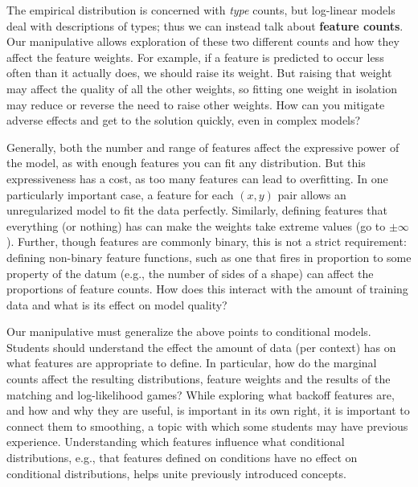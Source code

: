\documentclass[11pt,letterpaper]{article}
\newcommand{\Data}[0]{\ensuremath{\mathcal{D}}}
\begin{document}
The empirical distribution is concerned with \textit{type} counts, but log-linear models 
deal with descriptions of types; thus we can instead talk about \textbf{feature counts}. Our 
manipulative allows exploration of these two different counts and how they affect the 
feature weights. For example, if a feature is predicted to occur less often than it actually does, 
we should raise its weight. But raising that weight 
may affect the quality of all the other weights, so fitting one weight in
isolation may reduce or reverse the need to raise other weights. How can you mitigate  
adverse effects and get to the solution quickly, even in complex models?

Generally, both the number and range of features affect the expressive 
power of the model, as with enough features you can fit any distribution. But this expressiveness 
has a cost, as too many features can lead to overfitting. 
In one particularly important case, a feature for each $(x,y)$ pair allows an unregularized model to fit the 
data perfectly. 
Similarly, defining features that everything (or nothing) has can make the weights 
take extreme values (go to $\pm \infty$). Further, though features are commonly binary, 
this is not a strict requirement: defining non-binary feature functions, such as one that fires in 
proportion to some property of the datum (e.g., the number of sides of a shape) can affect the
proportions of feature counts. How does this interact with the amount of training data and what is its 
effect on model quality?

Our manipulative must generalize the above points to conditional models. Students should 
understand the effect the amount of data (per context) has on what features are appropriate to define. 
In particular, how do the marginal counts affect the resulting distributions, feature 
weights and the results of the matching and log-likelihood games? 
While exploring what backoff features are, and how and why they are useful, is important in its own right, 
it is important to connect them to smoothing, a topic with which some students may have previous experience. 
Understanding which features influence 
what conditional distributions, e.g., that features defined on conditions have no effect on conditional distributions, 
helps unite previously introduced concepts.%

\end{document}
